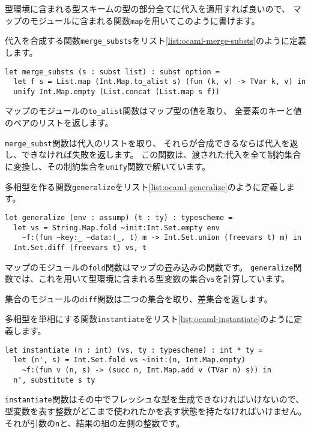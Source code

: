型環境に含まれる型スキームの型の部分全てに代入を適用すれば良いので、
マップのモジュールに含まれる関数\texttt{map}を用いてこのように書けます。

代入を合成する関数\texttt{merge\_substs}をリスト\ref{list:ocaml-merge-substs}のように定義します。

\begin{lstlisting}[caption=代入の合成, label=list:ocaml-merge-substs]
let merge_substs (s : subst list) : subst option =
  let f s = List.map (Int.Map.to_alist s) (fun (k, v) -> TVar k, v) in
  unify Int.Map.empty (List.concat (List.map s f))
\end{lstlisting}

マップのモジュールの\texttt{to\_alist}関数はマップ型の値を取り、
全要素のキーと値のペアのリストを返します。

\texttt{merge\_subst}関数は代入のリストを取り、
それらが合成できるならば代入を返し、できなければ失敗を返します。
この関数は、渡された代入を全て制約集合に変換し、その制約集合を\texttt{unify}関数で解いています。

多相型を作る関数\texttt{generalize}をリスト\ref{list:ocaml-generalize}のように定義します。

\begin{lstlisting}[caption=多相型を作る, label=list:ocaml-generalize]
let generalize (env : assump) (t : ty) : typescheme =
  let vs = String.Map.fold ~init:Int.Set.empty env
    ~f:(fun ~key:_ ~data:(_, t) m -> Int.Set.union (freevars t) m) in
  Int.Set.diff (freevars t) vs, t
\end{lstlisting}

マップのモジュールの\texttt{fold}関数はマップの畳み込みの関数です。
\texttt{generalize}関数では、これを用いて型環境に含まれる型変数の集合\texttt{vs}を計算しています。

集合のモジュールの\texttt{diff}関数は二つの集合を取り、差集合を返します。

多相型を単相にする関数\texttt{instantiate}をリスト\ref{list:ocaml-instantiate}のように定義します。

\begin{lstlisting}[caption=多相型を単相にする, label=list:ocaml-instantiate]
let instantiate (n : int) (vs, ty : typescheme) : int * ty =
  let (n', s) = Int.Set.fold vs ~init:(n, Int.Map.empty)
    ~f:(fun v (n, s) -> (succ n, Int.Map.add v (TVar n) s)) in
  n', substitute s ty
\end{lstlisting}

\texttt{instantiate}関数はその中でフレッシュな型を生成できなければいけないので、
型変数を表す整数がどこまで使われたかを表す状態を持たなければいけません。
それが引数の\texttt{n}と、結果の組の左側の整数です。

